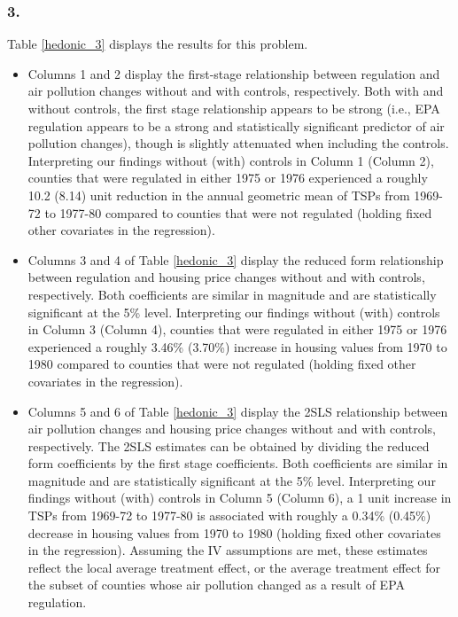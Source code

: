 \documentclass[12pt]{article}
\begin{document}
\subsubsection*{3.}
Table \ref{hedonic_3} displays the results for this problem.
\begin{itemize}
\item Columns 1 and 2 display the first-stage relationship between regulation and air pollution changes without and with controls, respectively. Both with and without controls, the first stage relationship appears to be strong (i.e., EPA regulation appears to be a strong and statistically significant predictor of air pollution changes), though is slightly attenuated when including the controls. Interpreting our findings without (with) controls in Column 1 (Column 2), counties that were regulated in either 1975 or 1976 experienced a roughly 10.2 (8.14) unit reduction in the annual geometric mean of TSPs from 1969-72 to 1977-80 compared to counties that were not regulated (holding fixed other covariates in the regression).

\item Columns 3 and 4 of Table \ref{hedonic_3} display the reduced form relationship between regulation and housing price changes without and with controls, respectively. Both coefficients are similar in magnitude and are statistically significant at the 5\% level. Interpreting our findings without (with) controls in Column 3 (Column 4), counties that were regulated in either 1975 or 1976 experienced a roughly 3.46\% (3.70\%) increase in housing values from 1970 to 1980 compared to counties that were not regulated (holding fixed other covariates in the regression).

\item Columns 5 and 6 of Table \ref{hedonic_3} display the 2SLS relationship between air pollution changes and housing price changes without and with controls, respectively. The 2SLS estimates can be obtained by dividing the reduced form coefficients by the first stage coefficients. Both coefficients are similar in magnitude and are statistically significant at the 5\% level. Interpreting our findings without (with) controls in Column 5 (Column 6), a 1 unit increase in TSPs from 1969-72 to 1977-80 is associated with roughly a 0.34\% (0.45\%) decrease in housing values from 1970 to 1980 (holding fixed other covariates in the regression). Assuming the IV assumptions are met, these estimates reflect the local average treatment effect, or the average treatment effect for the subset of counties whose air pollution changed as a result of EPA regulation.
\end{itemize}
\end{document}
